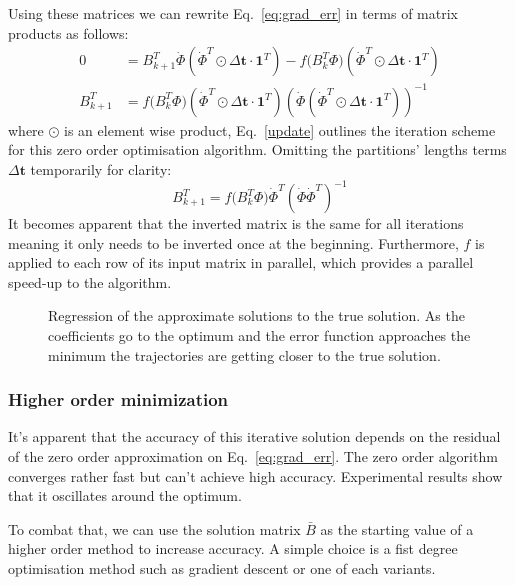 \documentclass[11pt]{report}
\begin{document}
    Using these matrices we can rewrite Eq.~\ref{eq:grad_err} in terms of matrix products as follows:
    \begin{align}
        0 &=
        B_{k+1}^T \dot\Phi (\dot\Phi^T \odot \Delta \pmb{t} \cdot \pmb{1}^T  ) -
        f \big( B_{k}^T  \Phi \big) ({\dot\Phi}^T \odot \Delta \pmb{t} \cdot \pmb{1}^T )
        \\
        B_{k+1}^T &=
        f \big( B_{k}^T \Phi \big) ( {\dot\Phi}^T \odot \Delta \pmb{t} \cdot \pmb{1}^T)
        ( \dot\Phi (\dot\Phi^T \odot \Delta \pmb{t} \cdot \pmb{1}^T ) )^{-1} \label{update}
    \end{align}
    where $\odot$ is an element wise product, Eq.~\ref{update} outlines the iteration scheme for this zero order optimisation algorithm.
    Omitting the partitions' lengths terms $\Delta \pmb{t}$ temporarily for clarity:
    \begin{equation}
        \label{eq:biter}
        B_{k+1}^T =
        f \big( B_{k}^T \Phi \big) {\dot\Phi}^T
        ( \dot\Phi \dot\Phi^T )^{-1}
    \end{equation}
    It becomes apparent that the inverted matrix is the same for all iterations meaning it only needs to be inverted
    once at the beginning.
    Furthermore, $f$ is applied to each row of its input matrix in parallel, which provides a parallel speed-up to
    the algorithm.
    \begin{figure}[H]
        \begin{center}
            
        \end{center}
        \caption{ Regression of the approximate solutions to the true solution. As the coefficients go to the
        optimum and the error function approaches the minimum the trajectories are getting closer to the true solution.}
        \label{fig:reg_sol}
    \end{figure}

    \subsubsection{Higher order minimization}
    It's apparent that the accuracy of this iterative solution depends on the residual of the zero order
    approximation on Eq.~\eqref{eq:grad_err}.
    The zero order algorithm converges rather fast but can't achieve high accuracy.
    Experimental results show that it oscillates around the optimum.

    To combat that, we can use the solution matrix $\bar B$ as the starting value of a higher order method to
    increase accuracy.
    A simple choice is a fist degree optimisation method such as gradient descent or one of each variants.
\end{document}
